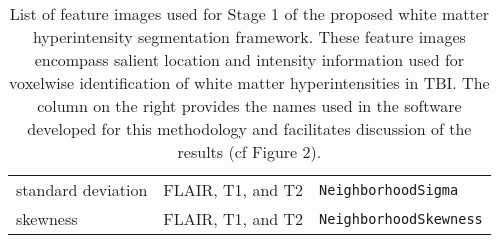 \begin{table}[!htb]
\begin{tabular*}{0.85\textwidth}{@{\extracolsep{\fill}} lll}
    standard deviation & FLAIR, T1, and T2  & \texttt{NeighborhoodSigma}\\
    skewness & FLAIR, T1, and T2  & \texttt{NeighborhoodSkewness}\\
    \midrule
    \bottomrule
  \end{tabular*}
 \label{table:indices}
 \caption{List of feature images used for Stage 1 of the proposed white matter
          hyperintensity segmentation framework.  These feature images encompass
          salient location and intensity information used for voxelwise identification
          of white matter hyperintensities in TBI.  The column on the right provides
          the names used in the software developed for this methodology and
          facilitates discussion of the results (cf Figure 2).
          }
\end{table}


